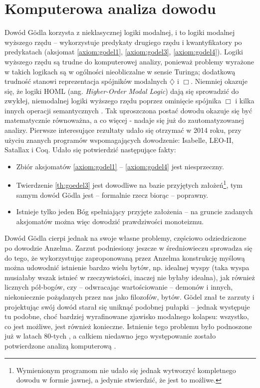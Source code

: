 \documentclass[runningheads]{llncs}
\begin{document}
\section{Komputerowa analiza dowodu}
Dowód G\"odla korzysta z nieklasycznej logiki modalnej, i to logiki modalnej wyższego rzędu -- wykorzystuje predykaty drugiego rzędu i kwantyfikatory po predykatach (aksjomat \ref{axiom:godel1}, \ref{axiom:godel3}, \ref{axiom:godel4}). Logiki wyższego rzędu są trudne do komputerowej analizy, ponieważ problemy wyrażone w takich logikach są w ogólności nieobliczalne w sensie Turinga; dodatkową trudność stanowi reprezentacja spójników modalnych $\diamondsuit$ i $\Box$. Niemniej okazuje się, że logiki HOML (ang. \textit{Higher-Order Modal Logic}) dają się sprowadzić do zwykłej, niemodalnej logiki wyższego rzędu poprzez ominięcie spójnika $\Box$ i kilka innych operacji semantycznych \cite{benzmuller2014}. Tak uproszczona postać dowodu okazuje się być matematycznie równoważna, a co więcej - nadaje się już do zautomatyzowanej analizy. Pierwsze interesujące rezultaty udało się otrzymać w 2014 roku, przy użyciu znanych programów wspomagających dowodzenie: Isabelle, LEO-II, Satallax i Coq. Udało się potwierdzić następujące fakty:
\begin{itemize}
	\item Zbiór aksjomatów \ref{axiom:godel1} -- \ref{axiom:godel4} jest niesprzeczny. 
	\item Twierdzenie \ref{th:goedel3} jest dowodliwe na bazie przyjętych założeń\footnote{Wymienionym programom nie udało się jednak wytworzyć kompletnego dowodu w formie jawnej, a jedynie stwierdzić, że jest to możliwe. }, tym samym dowód G\"odla jest -- formalnie rzecz biorąc -- poprawny.
	\item Istnieje tylko jeden Bóg spełniający przyjęte założenia -- na  gruncie zadanych aksjomatów można więc dowodzić prawdziwości monoteizmu. 
\end{itemize}

Dowód G\"odla cierpi jednak na swoje własne problemy, częściowo odziedziczone po dowodzie Anzelma. Zarzut podniesiony jeszcze w średniowieczu sprowadza się do tego, że wykorzystując zaproponowaną przez Anzelma konstrukcję myślową można udowodnić istnienie bardzo wielu bytów, np. idealnej wyspy (taka wyspa musiałaby wszak istnieć w rzeczywistości, inaczej nie byłaby idealna), jak również licznych pół-bogów, czy -- odwracając wartościowanie -- demonów i innych, niekoniecznie pożądanych przez nas jako filozofów, bytów. G\"odel znał te zarzuty i projektując swój dowód starał się uniknąć podobnej pułapki -- jednak występuje tu podobne, choć bardziej wyrafinowane zjawisko modalnego kolapsu: wszystko, co jest możliwe, jest również konieczne. Istnienie tego problemu było podnoszone już w latach 80-tych \cite{sobel1987}, a całkiem niedawno jego występowanie zostało potwierdzone analizą komputerową \cite{benzmuller2014}. 
\end{document}
